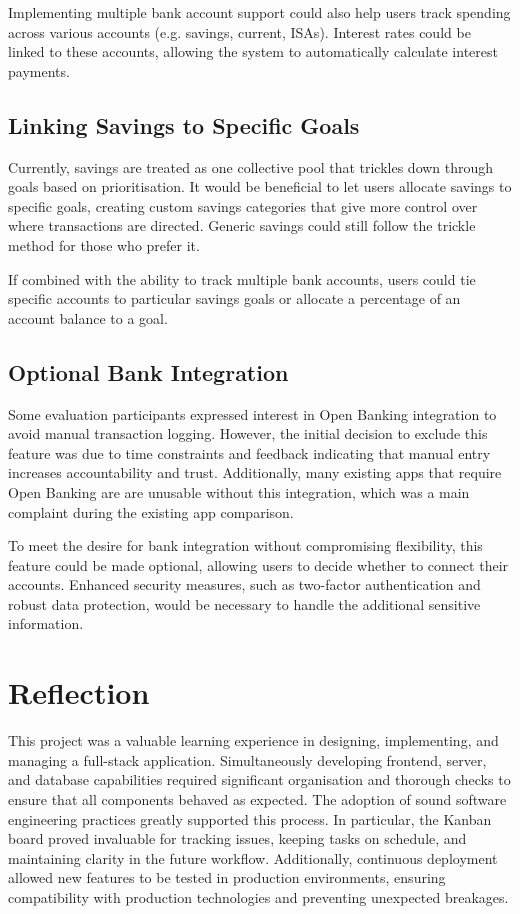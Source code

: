 \documentclass{l4proj}
\begin{document}
Implementing multiple bank account support could also help users track spending across various accounts (e.g. savings, current, ISAs). Interest rates could be linked to these accounts, allowing the system to automatically calculate interest payments.

\subsection{Linking Savings to Specific Goals}

Currently, savings are treated as one collective pool that trickles down through goals based on prioritisation. It would be beneficial to let users allocate savings to specific goals, creating custom savings categories that give more control over where transactions are directed. Generic savings could still follow the trickle method for those who prefer it.

If combined with the ability to track multiple bank accounts, users could tie specific accounts to particular savings goals or allocate a percentage of an account balance to a goal.

\subsection{Optional Bank Integration}

Some evaluation participants expressed interest in Open Banking integration to avoid manual transaction logging. However, the initial decision to exclude this feature was due to time constraints and feedback indicating that manual entry increases accountability and trust. Additionally, many existing apps that require Open Banking are are unusable without this integration, which was a main complaint during the existing app comparison.

To meet the desire for bank integration without compromising flexibility, this feature could be made optional, allowing users to decide whether to connect their accounts. Enhanced security measures, such as two-factor authentication and robust data protection, would be necessary to handle the additional sensitive information.

\section{Reflection}
This project was a valuable learning experience in designing, implementing, and managing a full-stack application. Simultaneously developing frontend, server, and database capabilities required significant organisation and thorough checks to ensure that all components behaved as expected. The adoption of sound software engineering practices greatly supported this process. In particular, the Kanban board proved invaluable for tracking issues, keeping tasks on schedule, and maintaining clarity in the future workflow. Additionally, continuous deployment allowed new features to be tested in production environments, ensuring compatibility with production technologies and preventing unexpected breakages.
\end{document}
